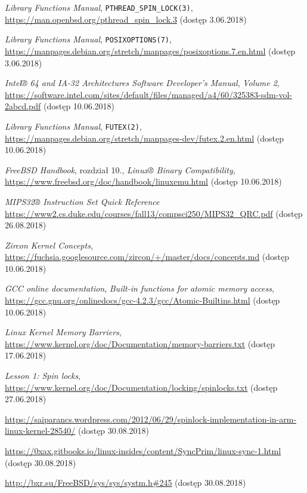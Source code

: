 \documentclass[shortabstract]{iithesis}
\theoremstyle{definition} \newtheorem*{definition}{Definicja}
\theoremstyle{definition} \newtheorem*{example}{Przykład}
\theoremstyle{definition} \newtheorem*{remark}{Uwaga}
\begin{document}
\begin{thebibliography}{99}
 \textit{Library Functions Manual}, \texttt{PTHREAD\_SPIN\_LOCK(3)},
\url{https://man.openbsd.org/pthread_spin_lock.3} (dostęp 3.06.2018)

 \textit{Library Functions Manual}, \texttt{POSIXOPTIONS(7)},
\url{https://manpages.debian.org/stretch/manpages/posixoptions.7.en.html} (dostęp 3.06.2018)

 \textit{Intel® 64 and IA-32 Architectures Software Developer’s Manual},
\textit{Volume 2},
\url{https://software.intel.com/sites/default/files/managed/a4/60/325383-sdm-vol-2abcd.pdf} (dostęp 10.06.2018)

 \textit{Library Functions Manual}, \texttt{FUTEX(2)},
\url{https://manpages.debian.org/stretch/manpages-dev/futex.2.en.html} (dostęp 10.06.2018)

 \textit{FreeBSD Handbook}, rozdział 10., \textit{Linux® Binary Compatibility},
\url{https://www.freebsd.org/doc/handbook/linuxemu.html} (dostęp 10.06.2018)

 \textit{MIPS32® Instruction Set Quick Reference}
\url{https://www2.cs.duke.edu/courses/fall13/compsci250/MIPS32_QRC.pdf} (dostęp 26.08.2018)

 \textit{Zircon Kernel Concepts},
\url{https://fuchsia.googlesource.com/zircon/+/master/docs/concepts.md} (dostęp 10.06.2018)

 \textit{GCC online documentation},
\textit{Built-in functions for atomic memory access},
\url{https://gcc.gnu.org/onlinedocs/gcc-4.2.3/gcc/Atomic-Builtins.html} (dostęp 10.06.2018)

 \textit{Linux Kernel Memory Barriers},
\url{https://www.kernel.org/doc/Documentation/memory-barriers.txt} (dostęp 17.06.2018)

 \textit{Lesson 1: Spin locks},
\url{https://www.kernel.org/doc/Documentation/locking/spinlocks.txt} (dostęp 27.06.2018)

\url{https://saiparancs.wordpress.com/2012/06/29/spinlock-implementation-in-arm-linux-kernel-28540/}
(dostęp 30.08.2018)

\url{https://0xax.gitbooks.io/linux-insides/content/SyncPrim/linux-sync-1.html}
(dostęp 30.08.2018)

\url{http://bxr.su/FreeBSD/sys/sys/systm.h#245}
(dostęp 30.08.2018)


\end{thebibliography}
\end{document}
